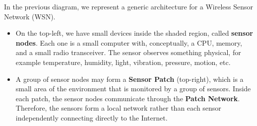 \begin{examplebox}
\begin{center}
    \end{center}

    In the previous diagram, we represent a generic architecture for a Wireless Sensor Network (WSN).
    \begin{itemize}
        \item On the top-left, we have small devices inside the shaded region, called \textbf{sensor nodes}. Each one is a small computer with, conceptually, a CPU, memory, and a small radio transceiver. The sensor observes something physical, for example temperature, humidity, light, vibration, pressure, motion, etc.

        \item A group of sensor nodes may form a \textbf{Sensor Patch} (top-right), which is a small area of the environment that is monitored by a group of sensors. Inside each patch, the sensor nodes communicate through the \textbf{Patch Network}. Therefore, the sensors form a local network rather than each sensor independently connecting directly to the Internet.


\end{itemize}
\end{examplebox}
